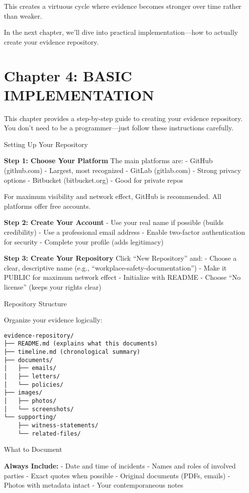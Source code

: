 This creates a virtuous cycle where evidence becomes stronger over time
rather than weaker.

In the next chapter, we'll dive into practical implementation---how to
actually create your evidence repository.

\section{Chapter 4: BASIC
IMPLEMENTATION}\label{chapter-4-basic-implementation}

This chapter provides a step-by-step guide to creating your evidence
repository. You don't need to be a programmer---just follow these
instructions carefully.

Setting Up Your Repository

\textbf{Step 1: Choose Your Platform} The main platforms are: - GitHub
(github.com) - Largest, most recognized - GitLab (gitlab.com) - Strong
privacy options - Bitbucket (bitbucket.org) - Good for private repos

For maximum visibility and network effect, GitHub is recommended. All
platforms offer free accounts.

\textbf{Step 2: Create Your Account} - Use your real name if possible
(builds credibility) - Use a professional email address - Enable
two-factor authentication for security - Complete your profile (adds
legitimacy)

\textbf{Step 3: Create Your Repository} Click ``New Repository'' and: -
Choose a clear, descriptive name (e.g.,
``workplace-safety-documentation'') - Make it PUBLIC for maximum network
effect - Initialize with README - Choose ``No license'' (keeps your
rights clear)

Repository Structure

Organize your evidence logically:

\begin{verbatim}
evidence-repository/
├── README.md (explains what this documents)
├── timeline.md (chronological summary)
├── documents/
│   ├── emails/
│   ├── letters/
│   └── policies/
├── images/
│   ├── photos/
│   └── screenshots/
└── supporting/
    ├── witness-statements/
    └── related-files/
\end{verbatim}

What to Document

\textbf{Always Include:} - Date and time of incidents - Names and roles
of involved parties - Exact quotes when possible - Original documents
(PDFs, emails) - Photos with metadata intact - Your contemporaneous
notes

